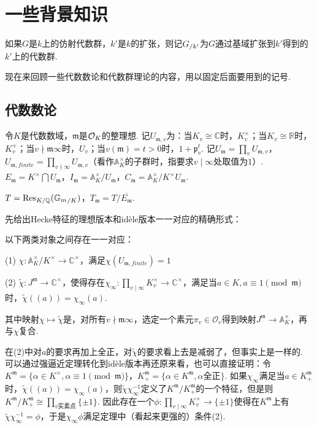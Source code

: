 \section{一些背景知识}

如果$G$是$k$上的仿射代数群，$k'$是$k$的扩张，则记${G}_{/k'}$为$G$通过基域扩张到$k'$得到的$k'$上的代数群.

现在来回顾一些代数数论和代数群理论的内容，用以固定后面要用到的记号.

\subsection{代数数论}

令$K$是代数数域，$\mathfrak{m}$是$\mathcal{O}_K$的整理想. 记$U_{\mathfrak{m}, v}$为：当$K_v \cong \mathbb{C}$时，$K_v^{\times}$；当$K_v\cong \mathbb{R}$时，$K_v^{+}$；当$v\nmid\mathfrak{m}\infty$时，$U_{v}$；当$v(\mathfrak{m})=t>0$时，$1+\mathfrak{p}_v^{t}$. 记$U_{\mathfrak{m}}=\prod_v U_{\mathfrak{m}, v}$，$U_{\mathfrak{m}, finite} = \prod_{v\nmid \infty}U_{\mathfrak{m}, v}$（看作$\mathbb{A}_K^{\times}$的子群时，指要求$v\mid \infty$处取值为$1$）. $E_{\mathfrak{m}} = K^{\times} \bigcap U_{\mathfrak{m}}$，$I_{\mathfrak{m}} = \mathbb{A}_K^{\times}/U_{\mathfrak{m}}$，$C_{\mathfrak{m}} = \mathbb{A}_K^{\times} / K^{\times}U_{\mathfrak{m}}$.

$T = \mathrm{Res}_{K/\mathbb{Q}}({\mathbb{G}_m}_{/K})$，$T_{\mathfrak{m}} = T / \overline{E_{\mathfrak{m}}}$.

先给出Hecke特征的理想版本和idèle版本一一对应的精确形式：

\begin{cthm}
    以下两类对象之间存在一一对应：

    (1) $\chi: \mathbb{A}_K^{\times}/K^{\times} \to \mathbb{C}^{\times}$，满足$\chi(U_{\mathfrak{m}, finite}) = 1$

    (2) $\tilde{\chi}: J^{\mathfrak{m}}\to \mathbb{C}^{\times}$，使得存在$\chi_{\infty}:\prod_{v\mid \infty}K_v^{\times} \to \mathbb{C}^{\times}$，满足当$a\in K, a\equiv 1\pmod{\mathfrak{m}}$时，$\tilde{\chi}((a)) = \chi_{\infty}(a)$.

    其中映射$\chi\mapsto \tilde{\chi}$是，对所有$v\nmid \mathfrak{m}\infty$，选定一个素元$\pi_v\in \mathcal{O}_v$得到映射$J^{\mathfrak{m}}\to \mathbb{A}_K^{\times}$，再与$\chi$复合.
\end{cthm}

\begin{crem}
    在(2)中对$a$的要求再加上全正，对$\tilde{\chi}$的要求看上去是减弱了，但事实上是一样的. 可以通过强逼近定理转化到idèle版本再还原来看，也可以直接证明：令$K^{\mathfrak{m}} = \{\alpha\in K^{\times}, \alpha\equiv 1\pmod{\mathfrak{m}}\}$，$K^{\mathfrak{m}}_{+} = \{\alpha\in K^{\mathfrak{m}}, \alpha 全正\}$. 如果$\chi_{\infty}$满足当$a\in K^{\mathfrak{m}}_{+}$时，$\tilde{\chi}((a)) = \chi_{\infty}(a)$，则$\tilde{\chi}\chi_{\infty}^{-1}$定义了$K^{\mathfrak{m}}/K^{\mathfrak{m}}_{+}$的一个特征，但是则$K^{\mathfrak{m}}/K^{\mathfrak{m}}_{+} \cong \prod_{v实素点} \{\pm 1\}$. 因此存在一个$\phi: \prod_{v\mid \infty} K_v^{\times}\to \{\pm 1\}$使得在$K^{\mathfrak{m}}$上有$\tilde{\chi}\chi_{\infty}^{-1} = \phi$，于是$\chi_{\infty}\phi$满足定理中（看起来更强的）条件(2).
\end{crem}

